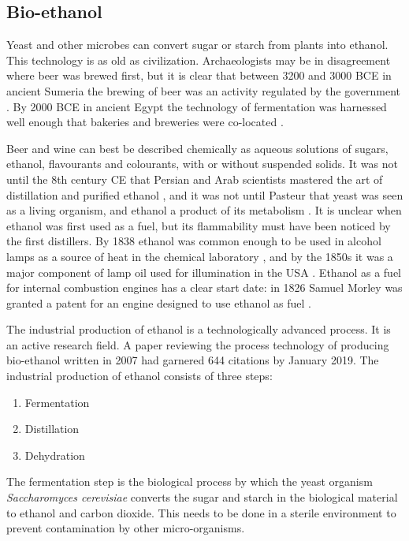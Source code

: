 \subsection{Bio-ethanol}
\label{sec:BioEthanol}
Yeast and other microbes can convert sugar or starch from plants into ethanol.
This technology is as old as civilization. Archaeologists may be in disagreement
where beer was brewed first, but it is clear that between 3200 and 3000 BCE in
ancient Sumeria the brewing of beer was an activity regulated by the government
\autocite{Damerow2012}. By 2000 BCE in ancient Egypt the technology of
fermentation was harnessed well enough that bakeries and breweries were
co-located \autocite{1920}.

Beer and wine can best be described chemically as aqueous solutions of sugars,
ethanol, flavourants and colourants, with or without suspended solids. It was
not until the 8th century CE that Persian and Arab scientists mastered the art
of distillation and purified ethanol \autocite{Modanlou2008}, and it was not
until Pasteur that yeast was seen as a living organism, and ethanol a product of
its metabolism \autocite{Barnett2000}. It is unclear when ethanol was first used
as a fuel, but its flammability must have been noticed by the first distillers.
By 1838 ethanol was common enough to be used in alcohol lamps as a source of
heat in the chemical laboratory \autocite{Griffin1838}, and by the 1850s it was
a major component of lamp oil used for illumination in the USA
\autocite{Abebe2008}. Ethanol as a fuel for internal combustion engines has a
clear start date: in 1826 Samuel Morley was granted a patent for an engine
designed to use ethanol as fuel \autocite[p. 79]{Cummins1989}.

The industrial production of ethanol is a technologically advanced process. It
is an active research field. A paper \autocite{Cardona2007} reviewing the
process technology of producing bio-ethanol written in 2007 had garnered 644
citations by January 2019. The industrial production of ethanol consists of
three steps:

\begin{enumerate}
  \item Fermentation
  \item Distillation
  \item Dehydration
\end{enumerate} 

The fermentation step is the biological process by which the yeast organism
\textit{Saccharomyces cerevisiae} converts the sugar and starch in the
biological material to ethanol and carbon dioxide. This needs to be done in a
sterile environment to prevent contamination by other micro-organisms.

